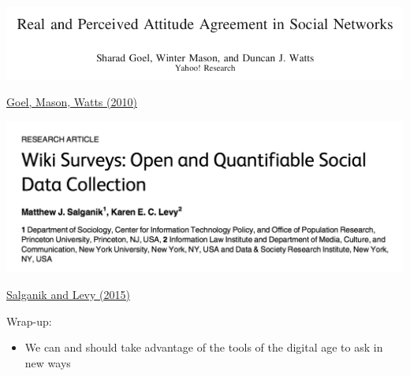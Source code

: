 \documentclass[aspectratio=169]{beamer}
\begin{document}
\begin{frame}

\begin{center}
\includegraphics[width=\textwidth]{figures/goel_real_2010_title}
\end{center}

\vfill
\href{https://doi.org/10.1037/a0020697}{Goel, Mason, Watts (2010)}

\end{frame}
\begin{frame}

\begin{center}
\includegraphics[width=\textwidth]{figures/salganik_wiki_2015_title}
\end{center}

\vfill
\href{https://doi.org/10.1371/journal.pone.0123483}{Salganik and Levy (2015)}

\end{frame}
\begin{frame}

Wrap-up:
\begin{itemize}
\item We can and should take advantage of the tools of the digital age to ask in new ways
\end{itemize}

\end{frame}
\frame{\titlepage}
\end{document}
